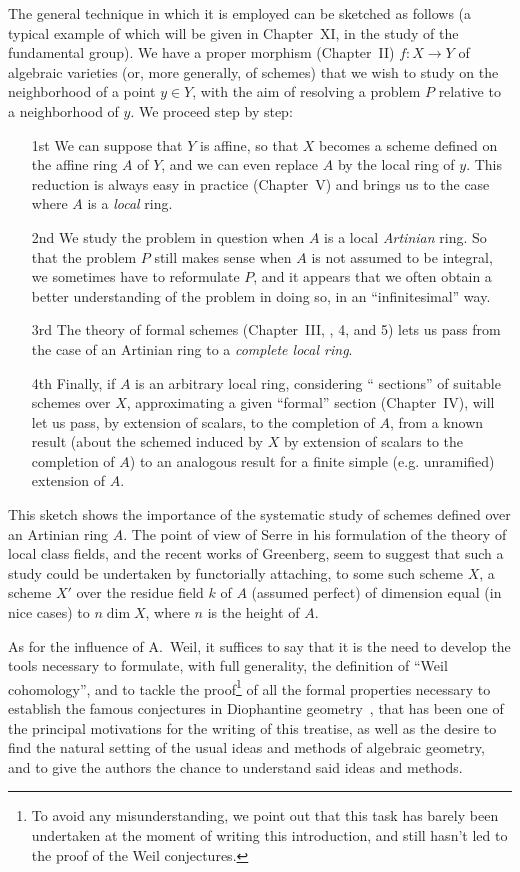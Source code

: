 The general technique in which it is employed can be sketched as follows (a typical example of which will be given in Chapter~XI, in the study of the fundamental group).
We have a proper morphism (Chapter~II) $f:X\to Y$ of algebraic varieties (or, more generally, of schemes) that we wish to study on the neighborhood of a point $y\in Y$, with the aim of resolving a problem $P$ relative to a neighborhood of $y$.
We proceed step by step:
\begin{enumerate}
  \item[1st]
    We can suppose that $Y$ is affine, so that $X$ becomes a scheme defined on the affine ring $A$ of $Y$, and we can even replace $A$ by the local ring of $y$.
    This reduction is always easy in practice (Chapter~V) and brings us to the case where $A$ is a \emph{local} ring.
  \item[2nd]
    We study the problem in question when $A$ is a local \emph{Artinian} ring.
    So that the problem $P$ still makes sense when $A$ is not assumed to be integral, we sometimes have to reformulate $P$, and it appears that we often obtain a better understanding of the problem in doing so, in an ``infinitesimal'' way.
  \item[3rd]
    The theory of formal schemes (Chapter~III, \textsection{}, 4, and 5) lets us pass from the case of an Artinian ring to a \emph{complete local ring}.
  \item[4th]
    Finally, if $A$ is an arbitrary local ring, considering `` sections'' of suitable schemes over $X$, approximating a given ``formal'' section (Chapter~IV), will let us pass,
by extension of scalars, to the completion of $A$, from a known result (about the schemed induced by $X$ by extension of scalars to the completion of $A$) to an analogous result for a finite simple (e.g. unramified) extension of $A$.
\end{enumerate}

This sketch shows the importance of the systematic study of schemes defined over an Artinian ring $A$.
The point of view of Serre in his formulation of the theory of local class fields, and the recent works of Greenberg, seem to suggest that such a study could be undertaken by functorially attaching, to some such scheme $X$, a scheme $X'$ over the residue field $k$ of $A$ (assumed perfect) of dimension equal (in nice cases) to $n\dim X$, where $n$ is the height of $A$.

As for the influence of A.~Weil, it suffices to say that it is the need to develop the tools necessary to formulate, with full generality, the definition of ``Weil cohomology'', and to tackle the proof\footnote{To avoid any misunderstanding, we point out that this task has barely been undertaken at the moment of writing this introduction, and still hasn't led to the proof of the Weil conjectures.} of all the formal properties necessary to establish the famous conjectures in Diophantine geometry~\cite{I-19}, that has been one of the principal motivations for the writing of this treatise, as well as the desire to find the natural setting of the usual ideas and methods of algebraic geometry, and to give the authors the chance to understand said ideas and methods.

